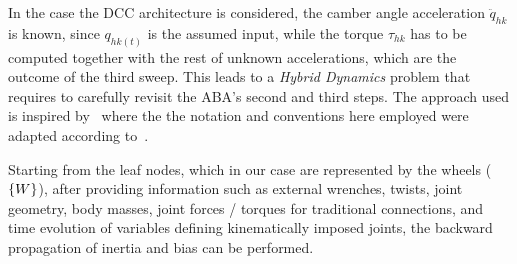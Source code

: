 In the case the DCC architecture is considered, the camber angle acceleration $\ddot{q}_{hk}$ is known, since $q_{hk(t)}$ is the assumed input, while the torque $\tau_{hk}$ has to be computed together with the rest of unknown accelerations, which are the outcome of the third sweep. This leads to a \emph{Hybrid Dynamics} problem that requires to carefully revisit the ABA's second and third steps.
The approach used is inspired by~\cite[Section~2.3]{Kim:notes:2012} where the the notation and conventions here employed were adapted according to~\cite{Domenighini:Designs:2023}.


Starting from the leaf nodes, which in our case are represented by the wheels ($\left\{W\right\}$), after providing information such as external wrenches, twists, joint geometry, body masses, joint forces / torques for traditional connections, and time evolution of variables defining kinematically imposed joints, the backward propagation of inertia and bias can be performed.

